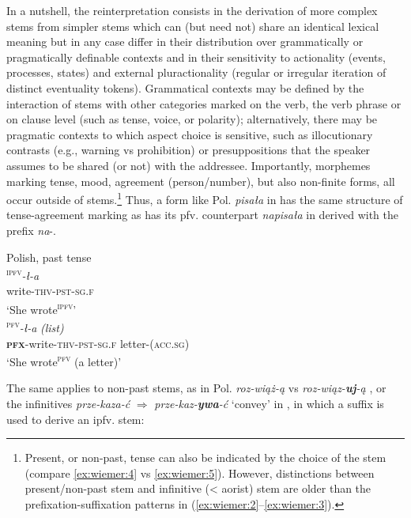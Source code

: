 \documentclass[output=paper,colorlinks,citecolor=brown]{langscibook}
\begin{document}
In a nutshell, the reinterpretation consists in the derivation of more complex stems from simpler stems which can (but need not) share an identical lexical meaning but in any case differ in their distribution over grammatically or pragmatically definable contexts and in their sensitivity to actionality (events, processes, states) and external pluractionality (regular or irregular iteration of distinct eventuality tokens). Grammatical contexts may be defined by the interaction of stems with other categories marked on the verb, the verb phrase or on clause level (such as tense, voice, or polarity); alternatively, there may be pragmatic contexts to which aspect choice is sensitive, such as illocutionary contrasts (e.g., warning vs prohibition) or presuppositions that the speaker assumes to be shared (or not) with the addressee. Importantly, morphemes marking tense, mood, agreement (person/number), but also non-finite forms, all occur outside of stems.\footnote{Present, or non-past, tense can also be indicated by the choice of the stem (compare \ref{ex:wiemer:4} vs \ref{ex:wiemer:5}). However, distinctions between present/non-past stem and infinitive (< aorist) stem are older than the prefixation-suffixation patterns in (\ref{ex:wiemer:2}--\ref{ex:wiemer:3}).} Thus, a form like Pol. \textit{pisała} in  has the same structure of tense-agreement marking as has its pfv. counterpart \textit{napisała} in  derived with the prefix \textit{na}-.

\ea Polish, past tense \label{ex:wiemer:4}\\
    \ea \label{ex:wiemer:4a}
        \textsc{\textsuperscript{ipfv}}\textit{-ł-a}\\
             write-\textsc{thv-pst-sg.f}\\
        \glt `She wrote\textsc{\textsuperscript{ipfv}}’\\
    
    \ex \label{ex:wiemer:4b}
        \textsc{\textsuperscript{pfv}}\textit{-ł-a} \textit{(list)}\\
             \textsc{\textbf{pfx}}-write-\textsc{thv-pst-sg.f} letter-(\textsc{acc.sg})\\
        \glt `She wrote\textsc{\textsuperscript{pfv}} (a letter)’\\
    \z
\z

The same applies to non-past stems, as in Pol. \textit{roz-wiąż-ą}  vs \textit{roz-wiąz-\textbf{uj}-ą} , or the infinitives \textit{prze-kaza-ć }$\Rightarrow$\textit{ prze-kaz-\textbf{ywa}-ć }‘convey’ in , in which a suffix is used to derive an ipfv. stem:
\end{document}
